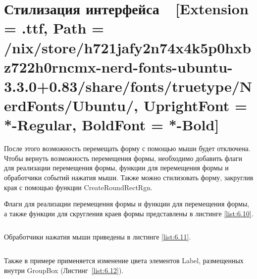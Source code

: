 \documentclass[12pt]{article}
\newcommand{\icon}[1]{\fontspec{UbuntuNerdFont}[Extension = .ttf,
  Path = /nix/store/h721jafy2n74x4k5p0hxbz722h0rncmx-nerd-fonts-ubuntu-3.3.0+0.83/share/fonts/truetype/NerdFonts/Ubuntu/,
  UprightFont = *-Regular,
BoldFont = *-Bold] #1}
\newcommand{\iicon}[1]{{\icon{#1}}}
\newcommand{\colorGIT}[1]{\textcolor{CtpLavender}{#1}}
\renewcommand{\texttt}[1]{{\small\ttfamily #1}}
\newenvironment{code}{\captionsetup{type=listing}}{}
\numberwithin{listing}{section}
\numberwithin{figure}{section}
\begin{document}
\newpage

\section{Стилизация интерфейса~~\texorpdfstring{\iicon{}}{}}


После этого возможность перемещать форму с помощью мыши будет отключена. Чтобы вернуть возможность перемещения формы, необходимо добавить флаги для реализации перемещения формы, функции для перемещения формы и обработчики событий нажатия мыши. Также можно стилизовать форму, закруглив края с помощью функции \texttt{CreateRoundRectRgn}.

Флаги для реализации перемещения формы и функции для перемещения формы, а также функции для скругления краев формы представлены в листинге \ref{list:6.10}.

\begin{code}
	\inputminted[firstline = 22, lastline=45]{csharp}{../../2lab/WinFormsApp1example_/Form1.cs}
	\caption{\colorGIT{\href{https://github.com/WebMasterIT/Csharp_Labs/blob/c79e983c4cab3c416e44b6d5f9854b292fdeae26/2lab/WinFormsApp1example_/Form1.cs\#L22-L45}{Функции}} реализации перемещения формы}
	\label{list:6.10}
\end{code}

Обработчики нажатия мыши приведены в листинге \ref{list:6.11}.

\begin{code}
	\inputminted[firstline = 47, lastline=78]{csharp}{../../2lab/WinFormsApp1example_/Form1.cs}
	\caption{\colorGIT{\href{https://github.com/WebMasterIT/Csharp_Labs/blob/c79e983c4cab3c416e44b6d5f9854b292fdeae26/2lab/WinFormsApp1example_/Form1.cs\#L47-L78}{Обработчики}} движения мыши}
	\label{list:6.11}
\end{code}

Также в примере применяется изменение цвета элементов \texttt{Label}, размещенных внутри \texttt{GroupBox} (Листинг~\ref{list:6.12}).

\begin{code}
	\inputminted[firstline = 134, lastline=163]{csharp}{../../2lab/WinFormsApp1example_/Form1.cs}
	\caption{\colorGIT{\href{https://github.com/WebMasterIT/Csharp_Labs/blob/c79e983c4cab3c416e44b6d5f9854b292fdeae26/2lab/WinFormsApp1example_/Form1.cs\#L134-L163}{Изменение}} цвета \texttt{Label} внутри \texttt{GroupBox}}
	\label{list:6.12}
\end{code}
\end{document}
